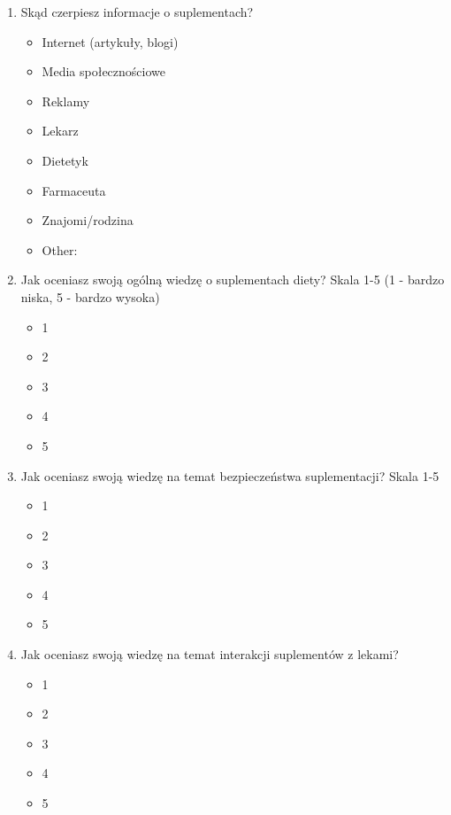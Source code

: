 \begin{appendices}
\begin{enumerate}
    \item Skąd czerpiesz informacje o suplementach?
    \begin{itemize}
        \item Internet (artykuły, blogi)
        \item Media społecznościowe
        \item Reklamy
        \item Lekarz
        \item Dietetyk
        \item Farmaceuta
        \item Znajomi/rodzina
        \item Other:
    \end{itemize}

    \item Jak oceniasz swoją ogólną wiedzę o suplementach diety? Skala 1-5 (1 - bardzo niska, 5 - bardzo wysoka)
    \begin{itemize}
        \item 1
        \item 2
        \item 3
        \item 4
        \item 5
    \end{itemize}

    \item Jak oceniasz swoją wiedzę na temat bezpieczeństwa suplementacji? Skala 1-5
    \begin{itemize}
        \item 1
        \item 2
        \item 3
        \item 4
        \item 5
    \end{itemize}

    \item Jak oceniasz swoją wiedzę na temat interakcji suplementów z lekami?
    \begin{itemize}
        \item 1
        \item 2
        \item 3
        \item 4
        \item 5
    \end{itemize}


\end{enumerate}
\end{appendices}
